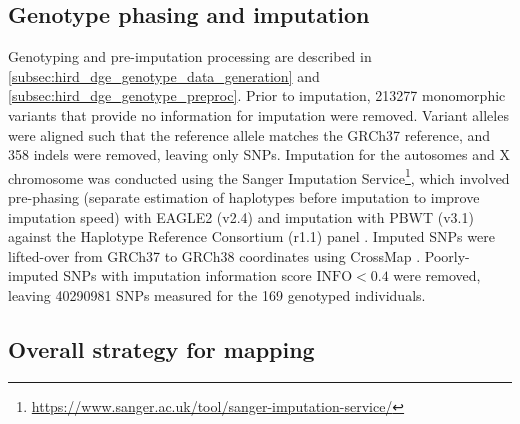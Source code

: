\subsection{Genotype phasing and imputation}
\label{subsec:hird_reQTL_methods_genotypePhasingAndImputation}

Genotyping and pre-imputation processing are described in \cref{subsec:hird_dge_genotype_data_generation} and \cref{subsec:hird_dge_genotype_preproc}.
Prior to imputation, \num{213277} monomorphic variants that provide no information for imputation were removed.
Variant alleles were aligned such that the reference allele matches the GRCh37 reference, and 358 indels were removed, leaving only \glspl{SNP}.
Imputation for the autosomes and X chromosome was conducted using the Sanger Imputation Service\footnote{\url{https://www.sanger.ac.uk/tool/sanger-imputation-service/}}, 
which involved pre-phasing (separate estimation of haplotypes before imputation to improve imputation speed) with EAGLE2 \autocite{loh2016ReferencebasedPhasingUsinga} (v2.4) 
and imputation with PBWT \autocite{durbin2014EfficientHaplotypeMatching} (v3.1) 
against the Haplotype Reference Consortium (r1.1) panel \autocite{mccarthy2016ReferencePanel64}.
Imputed \glspl{SNP} were lifted-over from GRCh37 to GRCh38 coordinates using CrossMap \autocite{zhao2014CrossMapVersatileTool}.
Poorly-imputed \glspl{SNP} with imputation information score $\text{INFO} < 0.4$
were removed, leaving \num{40290981} \glspl{SNP} measured for the 169 genotyped individuals.

\subsection{Overall strategy for mapping }
\label{subsec:hird_reQTL_overall_strategy}

